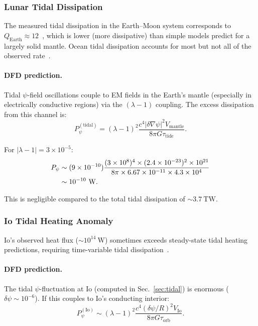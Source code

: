 \documentclass[aps,prd,twocolumn,showpacs,preprintnumbers,superscriptaddress,nofootinbib]{revtex4-2}
\begin{document}
\subsubsection{Lunar Tidal Dissipation}

The measured tidal dissipation in the Earth--Moon system corresponds to
$Q_{\mathrm{Earth}} \approx 12$~\cite{Williams2000}, which is lower
(more dissipative) than simple models predict for a largely solid
mantle.  Ocean tidal dissipation accounts for most but not all of the
observed rate~\cite{Egbert2001}.

\paragraph{DFD prediction.}
Tidal $\psi$-field oscillations couple to EM fields in the Earth's
mantle (especially in electrically conductive regions) via the
$(\lambda-1)$ coupling.  The excess dissipation from this channel is:
\begin{equation}
P_\psi^{(\mathrm{tidal})} = (\lambda-1)^2\frac{c^4|\delta\nabla\psi|^2 V_{\mathrm{mantle}}}{8\pi G\tau_{\mathrm{tide}}}.
\end{equation}

For $|\lambda-1| = 3\times 10^{-5}$:
\begin{align}
P_\psi &\sim (9\times 10^{-10})\frac{(3\times 10^8)^4\times(2.4\times 10^{-23})^2\times 10^{21}}{8\pi\times 6.67\times 10^{-11}\times 4.3\times 10^4} \notag\\
  &\sim 10^{-10}~\mathrm{W}.
\end{align}

This is negligible compared to the total tidal dissipation of
$\sim 3.7~\mathrm{TW}$.

\subsubsection{Io Tidal Heating Anomaly~\cite{Lainey2009}}

Io's observed heat flux ($\sim 10^{14}~\mathrm{W}$) sometimes exceeds
steady-state tidal heating predictions, requiring time-variable tidal
dissipation~\cite{Tyler2015}.

\paragraph{DFD prediction.}
The tidal $\psi$-fluctuation at Io (computed in Sec.~\ref{sec:tidal})
is enormous ($\delta\psi \sim 10^{-6}$).  If this couples to Io's
conducting interior:
\begin{equation}
P_\psi^{(\mathrm{Io})} \sim (\lambda-1)^2\frac{c^4(\delta\psi/R)^2 V_{\mathrm{Io}}}{8\pi G\tau_{\mathrm{orb}}}.
\end{equation}
\end{document}
